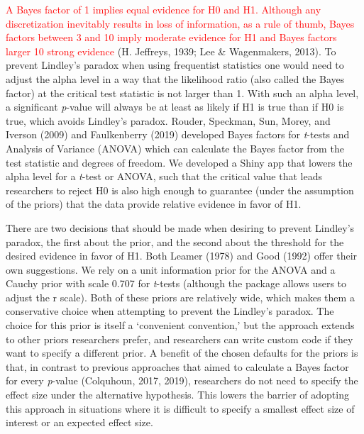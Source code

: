 \documentclass[
  english,
  ,man, a4paper,floatsintext]{apa6}
\begin{document}
\textcolor{red}{A Bayes factor of 1 implies equal evidence for H0 and H1. Although any discretization inevitably results in loss of information, as a rule of thumb, Bayes factors between 3 and 10 imply moderate evidence for H1 and Bayes factors larger 10 strong evidence} (H. Jeffreys, 1939; Lee \& Wagenmakers, 2013). To prevent Lindley's paradox when using frequentist statistics one would need to adjust the alpha level in a way that the likelihood ratio (also called the Bayes factor) at the critical test statistic is not larger than 1. With such an alpha level, a significant \emph{p}-value will always be at least as likely if H1 is true than if H0 is true, which avoids Lindley's paradox. Rouder, Speckman, Sun, Morey, and Iverson (2009) and Faulkenberry (2019) developed Bayes factors for \emph{t}-tests and Analysis of Variance (ANOVA) which can calculate the Bayes factor from the test statistic and degrees of freedom. We developed a Shiny app that lowers the alpha level for a \emph{t}-test or ANOVA, such that the critical value that leads researchers to reject H0 is also high enough to guarantee (under the assumption of the priors) that the data provide relative evidence in favor of H1.

There are two decisions that should be made when desiring to prevent Lindley's paradox, the first about the prior, and the second about the threshold for the desired evidence in favor of H1. Both Leamer (1978) and Good (1992) offer their own suggestions. We rely on a unit information prior for the ANOVA and a Cauchy prior with scale 0.707 for \emph{t}-tests (although the package allows users to adjust the r scale). Both of these priors are relatively wide, which makes them a conservative choice when attempting to prevent the Lindley's paradox. The choice for this prior is itself a `convenient convention,' but the approach extends to other priors researchers prefer, and researchers can write custom code if they want to specify a different prior. A benefit of the chosen defaults for the priors is that, in contrast to previous approaches that aimed to calculate a Bayes factor for every \emph{p}-value (Colquhoun, 2017, 2019), researchers do not need to specify the effect size under the alternative hypothesis. This lowers the barrier of adopting this approach in situations where it is difficult to specify a smallest effect size of interest or an expected effect size.
\end{document}
